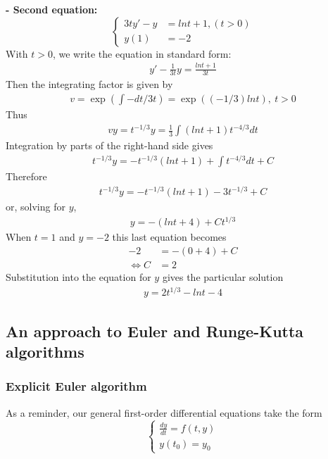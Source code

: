\documentclass[a4paper]{article}
\numberwithin{equation}{section}
\begin{document}
\textbf{- Second equation:}
\begin{equation*}
  \begin{cases}
    3ty' - y & = lnt + 1, (t > 0) \\
    y(1)     & = -2
  \end{cases}
\end{equation*}
With \(t > 0\), we write the equation in standard form:
\begin{align*}
  y' - \frac{1}{3t}y = \frac{lnt + 1}{3t}
\end{align*}
Then the integrating factor is given by
\begin{align*}
  v = \exp \left(\int -dt/3t\right) = \exp((-1/3)lnt),\ t > 0
\end{align*}
Thus
\begin{align*}
  vy = t^{-1/3} y = \frac{1}{3} \int(lnt + 1) t^{-4/3} dt
\end{align*}
Integration by parts of the right-hand side gives
\begin{align*}
  t^{-1/3}y = -t^{-1/3}(lnt+1) + \int t^{-4/3}dt + C
\end{align*}
Therefore
\begin{align*}
  t^{-1/3}y = -t^{-1/3}(lnt+1) - 3t^{-1/3} + C
\end{align*}
or, solving for \(y\),
\begin{align*}
  y = -(lnt + 4) + Ct^{1/3}
\end{align*}
When \(t = 1\) and \(y = -2\) this last equation becomes
\begin{align*}
  -2                & = -(0+4) + C \\
  \Leftrightarrow C & = 2
\end{align*}
Substitution into the equation for \(y\) gives the particular solution
\begin{align*}
  y = 2t^{1/3} - lnt - 4
\end{align*}

\subsection{An approach to Euler and Runge-Kutta algorithms}
\subsubsection{Explicit Euler algorithm}\label{sssec:explicit_euler}
As a reminder, our general first-order differential equations take the form
\begin{equation*}
  \begin{cases}
    \frac{dy}{dt} = f(t,y) \\
    y(t_0) = y_0
  \end{cases}
\end{equation*}
\end{document}
